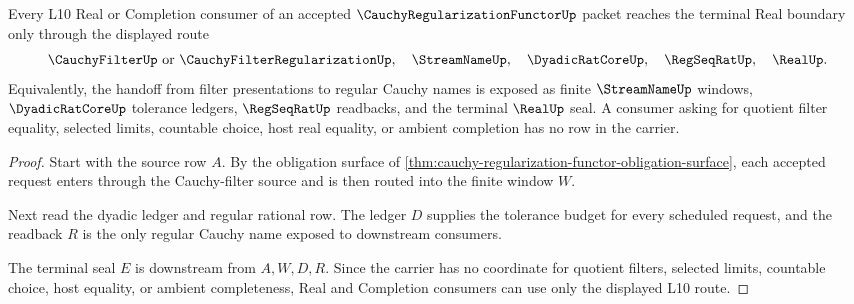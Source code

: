 
\begin{closurestatus}{\CauchyRegularizationFunctorUp}
  \theoryclosure{\seedClosure}
  \formalstatus{\unformalizedV}
\end{closurestatus}

\begin{theorem}
\label{thm:cauchy-regularization-functor-l10-handoff}
Every L10 Real or Completion consumer of an accepted $\CauchyRegularizationFunctorUp$ packet reaches the terminal Real boundary only through the displayed route
$$
\CauchyFilterUp\ \hbox{or}\ \CauchyFilterRegularizationUp,\quad
\StreamNameUp,\quad
\DyadicRatCoreUp,\quad
\RegSeqRatUp,\quad
\RealUp .
$$
Equivalently, the handoff from filter presentations to regular Cauchy names is exposed as finite $\StreamNameUp$ windows, $\DyadicRatCoreUp$ tolerance ledgers, $\RegSeqRatUp$ readbacks, and the terminal $\RealUp$ seal. A consumer asking for quotient filter equality, selected limits, countable choice, host real equality, or ambient completion has no row in the carrier.
\end{theorem}
\begin{proof}
Start with the source row $A$. By the obligation surface of \autoref{thm:cauchy-regularization-functor-obligation-surface}, each accepted request enters through the Cauchy-filter source and is then routed into the finite window $W$.

Next read the dyadic ledger and regular rational row. The ledger $D$ supplies the tolerance budget for every scheduled request, and the readback $R$ is the only regular Cauchy name exposed to downstream consumers.

The terminal seal $E$ is downstream from $A,W,D,R$. Since the carrier has no coordinate for quotient filters, selected limits, countable choice, host equality, or ambient completeness, Real and Completion consumers can use only the displayed L10 route.
\end{proof}
